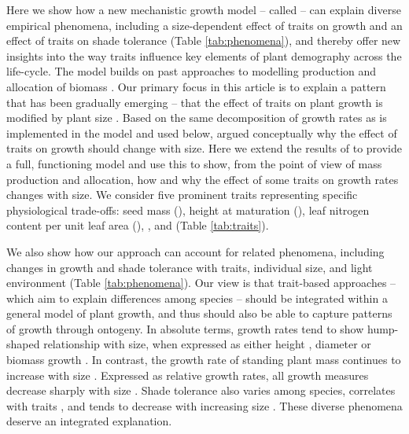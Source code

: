 \documentclass[9pt,twocolumn,twoside,lineno]{pnas-new}
\begin{document}
Here we show how a new mechanistic growth model -- called {\plant} \citep{Falster-2016} -- can explain diverse empirical phenomena, including a size-dependent effect of traits on growth and an effect of traits on shade tolerance (Table \ref{tab:phenomena}), and thereby offer new insights into the way traits influence key elements of plant demography across the life-cycle. The {\plant} model builds on past approaches to modelling production and allocation of biomass \citep[e.g.][]{Givnish-1988, Yokozawa-1995,Makela-1997, Moorcroft-2001, Sitch-2008, Falster-2011, King-2011, Gibert-2016}. Our primary focus in this article is to explain a pattern that has been gradually emerging -- that the effect of traits on plant growth is modified by plant size \citep{Ruger-2012, Iida-2014, Gibert-2016}. Based on the same decomposition of growth rates as is implemented in the {\plant} model and used below, \citep{Gibert-2016} argued conceptually why the effect of traits on growth should change with size. Here we extend the results of \citep{Gibert-2016} to provide a full, functioning model and use this to show, from the point of view of mass production and allocation, how and why the effect of some traits on growth rates changes with size. We consider five prominent traits representing specific physiological trade-offs: seed mass ({\seed}), height at maturation ({\hmat}), leaf nitrogen content per unit leaf area ({\nitrogen}),  {\lma}, and {\wood} (Table \ref{tab:traits}).  

We also show how our approach can account for related phenomena, including changes in growth and shade tolerance with traits, individual size, and light environment (Table \ref{tab:phenomena}). Our view is that trait-based approaches -- which aim to explain differences among species -- should be integrated within a general model of plant growth, and thus should also be able to capture patterns of growth through ontogeny. In absolute terms, growth rates tend to show hump-shaped relationship with size, when expressed as either height \citep{Sillett-2010, King-2011}, diameter \citep{Canham-2004, Canham-2006, Herault-2011} or biomass growth \citep{Givnish-1988, Koch-2004}. In contrast, the growth rate of standing plant mass continues to increase with size \citep{Sillett-2010, Stephenson-2014}. Expressed as relative growth rates, all growth measures decrease sharply with size \citep{Rees-2010, Iida-2014}. Shade tolerance also varies among species, correlates with traits \citep{Messier-1999, Lusk-2008, Poorter-2006}, and tends to decrease with increasing size \citep{Givnish-1988, Kneeshaw-2006, Lusk-2008}. These diverse phenomena deserve an integrated explanation.
\end{document}
